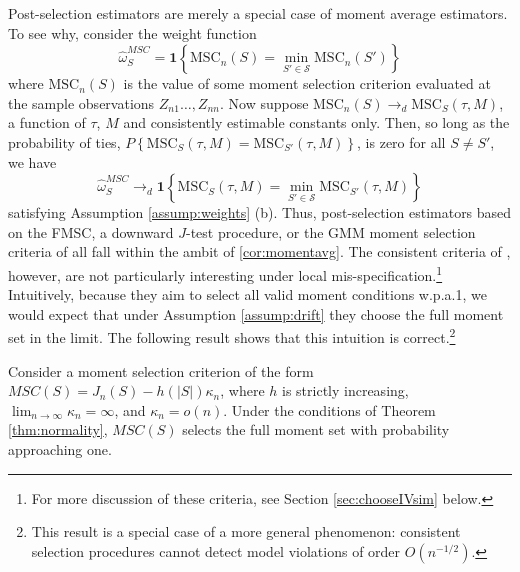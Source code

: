 Post-selection estimators are merely a special case of moment average estimators.
To see why, consider the weight function
$$\widehat{\omega}_S^{MSC} = \mathbf{1}\left\{\mbox{MSC}_n(S) = \min_{S'\in \mathscr{S}} \mbox{MSC}_n(S')\right\}$$where $\mbox{MSC}_n(S)$ is the value of some moment selection criterion evaluated at the sample observations $Z_{n1}\hdots, Z_{nn}$. 
Now suppose $\mbox{MSC}_n(S) \rightarrow_d\mbox{MSC}_S(\tau,M)$, a function of $\tau$, $M$ and consistently estimable constants only. 
Then, so long as the probability of ties, $P\left\{\mbox{MSC}_S(\tau,M) = \mbox{MSC}_{S'}(\tau,M) \right\}$, is zero for all $S\neq S'$, we have 
	$$\widehat{\omega}_S^{MSC} \rightarrow_d \mathbf{1}\left\{\mbox{MSC}_S(\tau,M) = \min_{S'\in \mathscr{S}} \mbox{MSC}_{S'}(\tau,M)\right\}$$ 
satisfying Assumption \ref{assump:weights} (b). 
Thus, post-selection estimators based on the FMSC, a downward $J$-test procedure, or the GMM moment selection criteria of \cite{Andrews1999} all fall within the ambit of \ref{cor:momentavg}. 
The consistent criteria of \cite{Andrews1999}, however, are not particularly interesting under local mis-specification.\footnote{For more discussion of these criteria, see Section \ref{sec:chooseIVsim} below.}
Intuitively, because they aim to select all valid moment conditions w.p.a.1, we would expect that under Assumption \ref{assump:drift} they choose the full moment set in the limit. 
The following result shows that this intuition is correct.\footnote{This result is a special case of a more general phenomenon: consistent selection procedures cannot detect model violations of order $O(n^{-1/2})$.}
\begin{thm}
\label{pro:andrews}
Consider a moment selection criterion of the form $MSC(S) = J_n(S) - h(|S|)\kappa_n$, where $h$ is strictly increasing,  $\lim_{n\rightarrow \infty}\kappa_n = \infty$, and $\kappa_n = o(n)$. Under the conditions of Theorem \ref{thm:normality}, $MSC(S)$ selects the full moment set with probability approaching one.
\end{thm}
